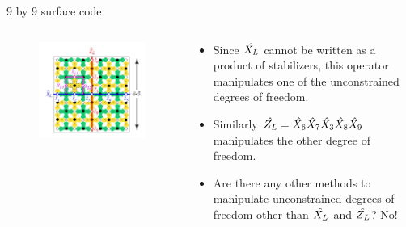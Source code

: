 \documentclass{beamer}
\begin{document}
    \begin{frame}{9 by 9 surface code}
        \begin{minipage}[0.65\textheight]{\textwidth}
        \begin{columns}[T]
            \begin{column}{0.4\textwidth}
                \begin{figure}[t]
                    \centering
                    \includegraphics[height=0.6\textheight]{./Images/surf-code-logical.jpg}
                \end{figure}
            \end{column}
            \begin{column}{0.6\textwidth}
                \begin{itemize}
                \item Since $ \sshat{X_L} $ cannot be written as a product of stabilizers, this operator manipulates one of the unconstrained degrees of freedom.
                \item Similarly $ \sshat{Z_L} = \sshat{X_6}\sshat{X_7}\sshat{X_3}\sshat{X_8}\sshat{X_9}$ manipulates the other degree of freedom.
                \item Are there any other methods to manipulate unconstrained degrees of freedom other than $ \sshat{X_L} $ and $ \sshat{Z_L} $? No!
                \end{itemize}
            \end{column}
        \end{columns}
        \end{minipage}
    \end{frame}
    
\end{document}
